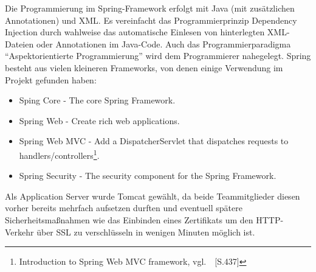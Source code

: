 Die Programmierung im Spring-Framework erfolgt mit Java (mit zusätzlichen Annotationen) und XML. Es vereinfacht das Programmierprinzip Dependency Injection durch wahlweise das automatische Einlesen von hinterlegten XML-Dateien oder Annotationen im Java-Code. Auch das Programmierparadigma ``Aspektorientierte Programmierung'' wird dem Programmierer nahegelegt.
Spring besteht aus vielen kleineren Frameworks, von denen einige Verwendung im Projekt gefunden haben:
\begin{itemize}
\item Sping Core - The core Spring Framework.
\item Spring Web - Create rich web applications.
\item Spring Web MVC - Add a DispatcherServlet that dispatches requests to handlers/controllers\footnote{ Introduction to Spring Web MVC framework, vgl.~\cite{webmvc}~[S.437]}. 
\item Spring Security - The security component for the Spring Framework.
\end{itemize}

Als Application Server wurde Tomcat gewählt, da beide Teammitglieder diesen vorher bereits mehrfach aufsetzen durften und eventuell spätere Sicherheitsmaßnahmen wie das Einbinden eines Zertifikats um den HTTP-Verkehr über SSL zu verschlüsseln in wenigen Minuten möglich ist.